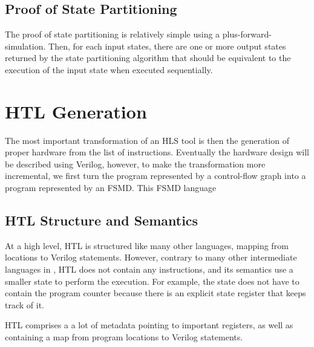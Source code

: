 \subsection{Proof of State Partitioning}

The proof of state partitioning is relatively simple using a
\gls{plus-forward-simulation}.  Then, for each input states, there are one or
more output states returned by the state partitioning algorithm that should be
equivalent to the execution of the input state when executed sequentially.

\section{HTL Generation}%
\label{sec:hg:htl-generation}

The most important transformation of an HLS tool is then the generation of
proper hardware from the list of instructions.  Eventually the hardware design
will be described using Verilog, however, to make the transformation more
incremental, we first turn the program represented by a control-flow graph into
a program represented by an \gls{FSMD}.  This \gls{FSMD} language

\subsection{HTL Structure and Semantics}%
\label{sec:hg:htl-structure-and-semantics}

At a high level, HTL is structured like many other \compcert{} languages,
mapping from locations to Verilog statements.  However, contrary to many other
intermediate languages in \compcert{}, HTL does not contain any instructions,
and its semantics use a smaller state to perform the execution.  For example,
the state does not have to contain the program counter because there is an
explicit state register that keeps track of it.

HTL comprises a a lot of metadata pointing to important registers, as well as
containing a map from program locations to Verilog statements.


